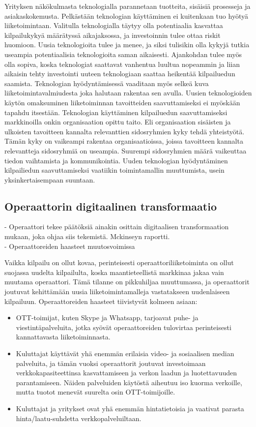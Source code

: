\documentclass[finnish,12pt,a4paper,pdftex]{article}
\begin{document}
Yrityksen näkökulmasta teknologialla parannetaan tuotteita, sisäisiä prosesseja ja asiakaskokemusta. Pelkästään teknologian käyttäminen ei kuitenkaan tuo hyötyä liiketoimintaan. Valitulla teknologialla täytyy olla potentiaalia kasvattaa kilpailukykyä määrätyssä aikajaksossa, ja investoinnin tulee ottaa riskit huomioon. Uusia teknologioita tulee ja menee, ja siksi tulisikin olla kykyjä tutkia useampia potentiaalisia teknologioita saman aikaisesti. Ajankohdan tulee myös olla sopiva, koska teknologiat saattavat vanhentua luultua nopeammin ja liian aikaisin tehty investointi uuteen teknologiaan saattaa heikentää kilpailuedun saamista. Teknologian hyödyntämisessä vaaditaan myös selkeä kuva liiketoimintavalmiudesta joka halutaan rakentaa sen avulla. Uusien teknologioiden käytön omaksuminen liiketoiminnan tavoitteiden saavuttamiseksi ei myöskään tapahdu itsestään. Teknologian käyttäminen kilpailuedun saavuttamiseksi markkinoilla onkin organisaation opittu taito. Eli organisaation sisäisten ja ulkoisten tavoitteen kannalta relevanttien sidosryhmien kyky tehdä yhteistyötä. Tämän kyky on vaikeampi rakentaa organisaatioissa, joissa tavoitteen kannalta relevantteja sidosryhmiä on useampia. Suurempi sidosryhmien määrä vaikeuttaa tiedon vaihtamista ja kommunikointia. Uuden teknologian hyödyntäminen kilpailiedun saavuttamiseksi vaatiikin toimintamallin muuttumista, usein yksinkertaisempaan suuntaan.

\subsection{Operaattorin digitaalinen transformaatio}

- Operaattori tekee päätöksiä ainakin osittain digitaalisen transformaation mukaan, joka ohjaa siis tekemistä. Mckinseyn raportti.\\
- Operaattoreiden haasteet muutosvoimissa

Vaikka kilpailu on ollut kovaa, perinteisesti operaattoriliiketoiminta on ollut suojassa uudelta kilpailulta, koska maantieteellistä markkinaa jakaa vain muutama operaattori. Tämä tilanne on pikkuhiljaa muuttumassa, ja operaattorit joutuvat kehittämään uusia liiketoimintamalleja vastatakseen uudenlaiseen kilpailuun. Operaattoreiden haasteet tiivistyvät kolmeen asiaan: \citep{inderes}
\begin{itemize}
    \item[] OTT-toimijat, kuten Skype ja Whatsapp, tarjoavat puhe- ja viestintäpalveluita, jotka syövät operaattoreiden tulovirtaa perinteisesti kannattavasta liiketoiminnasta.
    \item[] Kuluttajat käyttävät yhä enemmän erilaisia video- ja sosiaalisen median palveluita, ja tämän vuoksi operaattorit joutuvat investoimaan verkkokapasiteettinsa kasvattamiseen ja verkon laadun ja luotettavuuden parantamiseen. Näiden palveluiden käytöstä aiheutuu iso kuorma verkoille, mutta tuotot menevät suurelta osin OTT-toimijoille.
    \item[] Kuluttajat ja yritykset ovat yhä enemmän hintatietoisia ja vaativat parasta hinta/laatu-suhdetta verkkopalveluiltaan.
\end{itemize}
\end{document}
